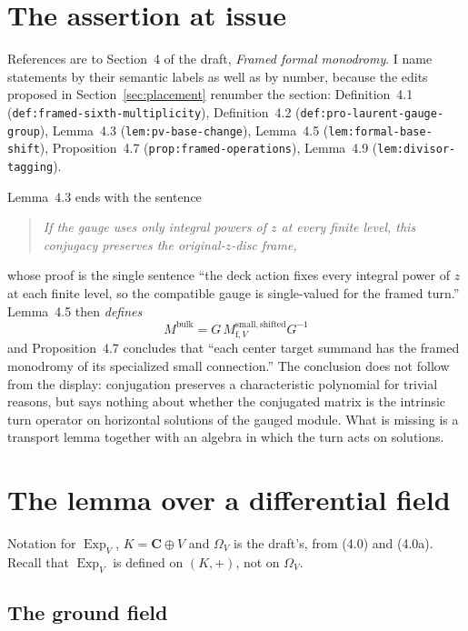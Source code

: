 \documentclass[11pt]{article}
\theoremstyle{definition}
\theoremstyle{remark}
\newcommand{\C}{\mathbf C}
\begin{document}
\section{The assertion at issue}

\sloppypar
References are to Section~4 of the draft, \emph{Framed formal monodromy}. I name
statements by their semantic labels as well as by number, because the edits
proposed in Section~\ref{sec:placement} renumber the section: Definition~4.1
(\texttt{def:framed-sixth-multiplicity}), Definition~4.2
(\texttt{def:pro-laurent-gauge-group}), Lemma~4.3
(\texttt{lem:pv-base-change}), Lemma~4.5 (\texttt{lem:formal-base-shift}),
Proposition~4.7 (\texttt{prop:framed-operations}), Lemma~4.9
(\texttt{lem:divisor-tagging}).

Lemma~4.3 ends with the sentence
\begin{quote}
  \emph{If the gauge uses only integral powers of $z$ at every finite level,
  this conjugacy preserves the original-$z$-disc frame,}
\end{quote}
whose proof is the single sentence ``the deck action fixes every integral power
of $z$ at each finite level, so the compatible gauge is single-valued for the
framed turn.'' Lemma~4.5 then \emph{defines}
\[
  M^{\mathrm{bulk}}=G\,M^{\mathrm{small,shifted}}_{\mathrm f,V}G^{-1}
  \tag{4.1c}
\]
and Proposition~4.7 concludes that ``each center target summand has the framed
monodromy of its specialized small connection.'' The conclusion does not follow
from the display: conjugation preserves a characteristic polynomial for trivial
reasons, but says nothing about whether the conjugated matrix is the intrinsic
turn operator on horizontal solutions of the gauged module. What is missing is a
transport lemma together with an algebra in which the turn acts on solutions.

\section{The lemma over a differential field}
\label{sec:lemma}

Notation for $\operatorname{Exp}_V$, $K=\C\oplus V$ and $\Omega_V$ is the
draft's, from (4.0) and (4.0a). Recall that $\operatorname{Exp}_V$ is defined on
$(K,+)$, not on $\Omega_V$.

\subsection*{The ground field}
\end{document}
